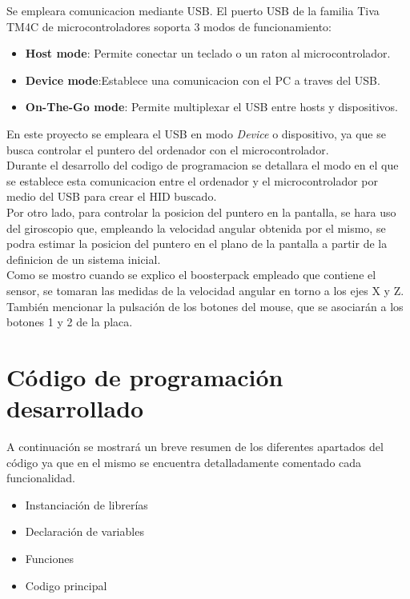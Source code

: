 \documentclass[a4paper,twoside]{article}
\begin{document}
Se empleara comunicacion mediante USB. El puerto USB de la familia Tiva TM4C de microcontroladores soporta 3 modos de funcionamiento:
\begin{itemize}
	\item \textbf{Host mode}: Permite conectar un teclado o un raton al microcontrolador.
	\item \textbf{Device mode}:Establece una comunicacion con el PC a traves del USB.
	\item \textbf{On-The-Go mode}: Permite multiplexar el USB entre hosts y dispositivos.
\end{itemize}
En este proyecto se empleara el USB en modo \textit{Device} o dispositivo, ya que se busca controlar el puntero del ordenador con el microcontrolador.\\
Durante el desarrollo del codigo de programacion se detallara el modo en el que se establece esta comunicacion entre el ordenador y el microcontrolador por medio del USB para crear el HID buscado. \\

Por otro lado, para controlar la posicion del puntero en la pantalla, se hara uso del giroscopio que, empleando la velocidad angular obtenida por el mismo, se podra estimar la posicion del puntero en el plano de la pantalla a partir de la definicion de un sistema inicial. \\
Como se mostro cuando se explico el boosterpack empleado que contiene el sensor, se tomaran las medidas de la velocidad angular en torno a los ejes X y Z. \\
También mencionar la pulsación de los botones del mouse, que se asociarán a los botones 1 y 2 de la placa.
\section{Código de programación desarrollado}
A continuación se mostrará un breve resumen de los diferentes apartados del código ya que en el mismo se encuentra detalladamente comentado cada funcionalidad. 
\begin{itemize}
\item Instanciación de librerías
\item Declaración de variables
\item Funciones
\item Codigo principal
\end{itemize}


\newpage
\end{document}
